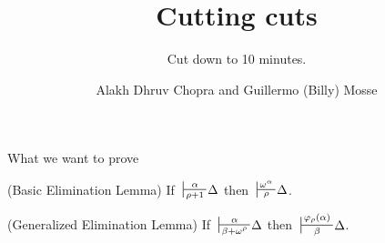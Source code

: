 \documentclass[10pt]{beamer}
\title{Cutting cuts}
\subtitle{Cut down to 10 minutes.}
\author{Alakh Dhruv Chopra and Guillermo (Billy) Mosse}
\institute{Chennai Mathematical Institute and Universidad de Buenos Aires}
\newcommand{\sintcons}[2]{\;\sststile{#2}{#1}\!}
\begin{document}
\maketitle


\begin{frame}{What we want to prove}



\begin{lemma}{(Basic Elimination Lemma)}
If $\sintcons{\alpha}{\rho+1}\Delta$ then $\sintcons{\omega^\alpha}{\rho} \Delta$.
\end{lemma}


\pause

\begin{lemma}{(Generalized Elimination Lemma)}
If $\sintcons{\alpha}{\beta+\omega^\rho} \Delta$ then $\sintcons{\varphi_\rho(\alpha)}{\beta} \Delta$.
\end{lemma}



\end{frame}
\end{document}
